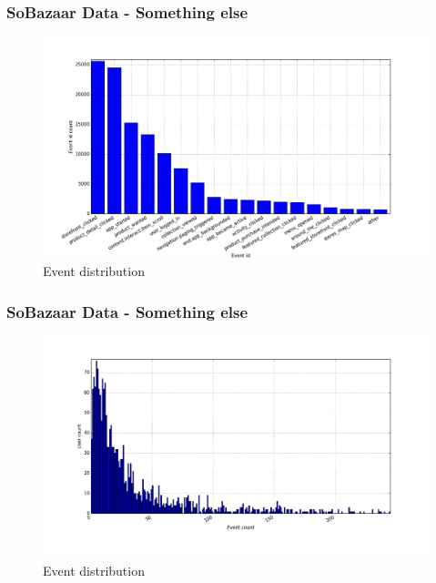 \documentclass{beamer}
\begin{document}
  \begin{frame}
    \frametitle{SoBazaar Data - Something else}
    \begin{figure}[H]
        \includegraphics[width=5in]{../src/image/event_iddistribution.png}
        \centering
        \caption{Event distribution}
    \label{figure:eventIDDistribution}
    \end{figure}
  \end{frame}

  \begin{frame}
    \frametitle{SoBazaar Data - Something else}
    \begin{figure}[H]
        \includegraphics[width=5in]{../src/image/user_iddistribution.png}
        \centering
        \caption{Event distribution}
    \label{figure:eventIDDistribution}
    \end{figure}
  \end{frame}
\end{document}
